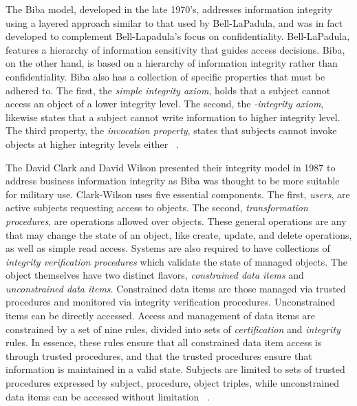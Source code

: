 The Biba model, developed in the late 1970's, addresses information integrity using a layered approach similar to that used by Bell-LaPadula, and was in fact developed to complement Bell-Lapadula's focus on confidentiality.  Bell-LaPadula, features a hierarchy of information sensitivity that guides access decisions.  Biba, on the other hand, is based on a hierarchy of information integrity rather than confidentiality.  Biba also has a collection of specific properties that must be adhered to.  The first, the {\it simple integrity axiom}, holds that a subject cannot access an object of a lower integrity level.  The second, the {\it *-integrity axiom}, likewise states that a subject cannot write information to higher integrity level.  The third property, the {\it invocation property}, states that subjects cannot invoke objects at higher integrity levels either ~\cite{Biba1977}.

The David Clark and David Wilson presented their integrity model in 1987 to address business information integrity as Biba was thought to be more suitable for military use.  Clark-Wilson uses five essential components.  The first, {\it users}, are active subjects requesting access to objects.  The second, {\it transformation procedures}, are operations allowed over objects.  These general operations are any that may change the state of an object, like create, update, and delete operations, as well as simple read access.  Systems are also required to have collections of {\it integrity verification procedures} which validate the state of managed objects.  The object themselves have two distinct flavors, {\it constrained data items} and {\it unconstrained data items}.  Constrained data items are those managed via trusted procedures and monitored via integrity verification procedures.  Unconstrained items can be directly accessed.  Access and management of data items are constrained by a set of nine rules, divided into sets of {\it certification} and {\it integrity} rules.  In essence, these rules ensure that all constrained data item access is through trusted procedures, and that the trusted procedures ensure that information is maintained in a valid state.  Subjects are limited to sets of trusted procedures expressed by subject, procedure, object triples, while unconstrained data items can be accessed without limitation ~\cite{ClaWil87}.






